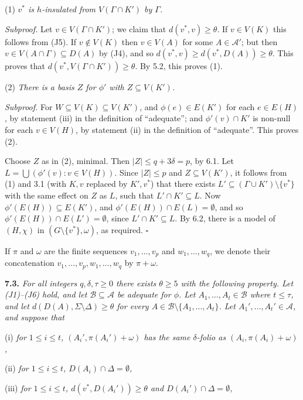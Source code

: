 \hspace*{12pt}(1) \textit{$v^*$ is $h$-insulated from $V(\Gamma \cap K')$ by $\Gamma$.}

\textit{Subproof.} Let $v \in V(\Gamma \cap K')$; we claim that $d(v^*, v) \ge \theta$. If $v \in V(K)$ this follows from (J5). If $v \notin V(K)$ then $v \in V(A)$ for some $A \in \mathcal{A}'$; but then $v \in V(A \cap \Gamma) \subseteq D(A)$ by (J4), and so $d(v^*, v) \ge d(v^*, D(A)) \ge \theta$. This proves that $d(v^*, V(\Gamma \cap K')) \ge \theta$. By 5.2, this proves (1).

\hspace*{12pt}(2) \textit{There is a basis $Z$ for $\phi'$ with $Z \subseteq V(K')$.}

\textit{Subproof.} For $W \subseteq V(K) \subseteq V(K')$, and $\phi(e) \in E(K')$ for each $e \in E(H)$, by statement (iii) in the definition of ``adequate''; and $\phi'(v) \cap K'$ is non-null for each $v \in V(H)$, by statement (ii) in the definition of ``adequate''. This proves (2).

Choose $Z$ as in (2), minimal. Then $|Z| \le q + 3\delta = p$, by 6.1. Let $L = \bigcup(\phi'(v) : v \in V(H))$. Since $|Z| \le p$ and $Z \subseteq V(K')$, it follows from (1) and 3.1 (with $K, v$ replaced by $K', v^*$) that there exists $L' \subseteq (\Gamma \cup K') \setminus \{v^*\}$ with the same effect on $Z$ as $L$, such that $L' \cap K' \subseteq L$. Now $\phi'(E(H)) \subseteq E(K')$, and $\phi'(E(H)) \cap E(L) = \emptyset$, and so $\phi'(E(H)) \cap E(L') = \emptyset$, since $L' \cap K' \subseteq L$. By 6.2, there is a model of $(H, \chi)$ in $(G \setminus \{v^*\}, \omega)$, as required. $\square$

If $\pi$ and $\omega$ are the finite sequences $v_1, \dots, v_p$ and $w_1, \dots, w_q$, we denote their concatenation $v_1, \dots, v_p, w_1, \dots, w_q$ by $\pi + \omega$.

\textbf{7.3.} \textit{For all integers $q, \delta, \tau \ge 0$ there exists $\theta \ge 5$ with the following property. Let (J1)--(J6) hold, and let $\mathcal{B} \subseteq \mathcal{A}$ be adequate for $\phi$. Let $A_1, \dots, A_t \in \mathcal{B}$ where $t \le \tau$, and let $d(D(A), \Sigma \setminus \Delta) \ge \theta$ for every $A \in \mathcal{B} \setminus \{A_1, \dots, A_t\}$. Let $A_1', \dots, A_t' \in \mathcal{A}$, and suppose that}

\hspace*{12pt}(i) \textit{for $1 \le i \le t$, $(A_i', \pi(A_i') + \omega)$ has the same $\delta$-folio as $(A_i, \pi(A_i) + \omega)$,}

\hspace*{12pt}(ii) \textit{for $1 \le i \le t$, $D(A_i) \cap \Delta = \emptyset$,}

\hspace*{12pt}(iii) \textit{for $1 \le i \le t$, $d(v^*, D(A_i')) \ge \theta$ and $D(A_i') \cap \Delta = \emptyset$,}
